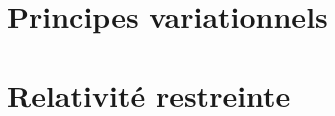 \documentclass[a4paper, 12pt]{article}
\begin{document}


\tableofcontents

\clearpage
\part{Principes variationnels}





\clearpage
\part{Relativité restreinte}



\end{document}
